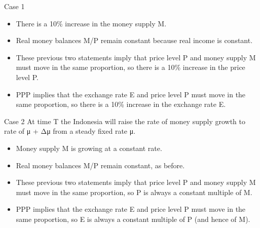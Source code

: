 \documentclass[
  ignorenonframetext,
]{beamer}
\begin{document}
\begin{frame}{Case 1}
\label{case-1}
\begin{itemize}
\item
  There is a 10\% increase in the money supply M.
\item
  Real money balances M/P remain constant because real income is
  constant.
\item
  These previous two statements imply that price level P and money
  supply M must move in the same proportion, so there is a 10\% increase
  in the price level P.
\item
  PPP implies that the exchange rate E and price level P must move in
  the same proportion, so there is a 10\% increase in the exchange rate
  E.
\end{itemize}
\end{frame}

\begin{frame}{Case 2}
\label{case-2}
At time T the Indonesia will raise the rate of money supply growth to
rate of μ + Δμ from a steady fixed rate μ.

\begin{itemize}
\item
  Money supply M is growing at a constant rate.
\item
  Real money balances M/P remain constant, as before.
\item
  These previous two statements imply that price level P and money
  supply M must move in the same proportion, so P is always a constant
  multiple of M.
\item
  PPP implies that the exchange rate E and price level P must move in
  the same proportion, so E is always a constant multiple of P (and
  hence of M).
\end{itemize}
\end{frame}
\end{document}
